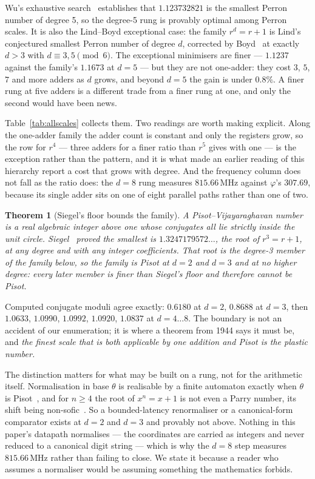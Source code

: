 \documentclass[11pt]{article}
\newtheorem{theorem}{Theorem}
\theoremstyle{definition}
\begin{document}
Wu's exhaustive search~\cite{wu2010} establishes that $1.123732821$ is the
smallest Perron number of degree 5, so the degree-5 rung is provably optimal
among Perron scales. It is also the Lind--Boyd exceptional case: the family
$r^d=r+1$ is Lind's conjectured smallest Perron number of degree $d$, corrected
by Boyd~\cite{boyd1985} at exactly $d>3$ with $d\equiv3,5 \pmod 6$. The
exceptional minimisers are finer --- $1.1237$ against the family's $1.1673$ at
$d=5$ --- but they are not one-adder: they cost $3$, $5$, $7$ and more adders as
$d$ grows, and beyond $d=5$ the gain is under $0.8\%$. A finer rung at five
adders is a different trade from a finer rung at one, and only the second would
have been news.

Table~\ref{tab:allscales} collects them. Two readings are worth making
explicit. Along the one-adder family the adder count is constant and only the
registers grow, so the row for $r^4$ --- three adders for a finer ratio than
$r^5$ gives with one --- is the exception rather than the pattern, and it is what
made an earlier reading of this hierarchy report a cost that grows with degree.
And the frequency column does not fall as the ratio does: the $d=8$ rung
measures $815.66$\,MHz against $\varphi$'s $307.69$, because its single adder
sits on one of eight parallel paths rather than one of two.

\begin{theorem}[Siegel's floor bounds the family]\label{thm:siegel}
A Pisot--Vijayaraghavan number is a real algebraic integer above one whose
conjugates all lie strictly inside the unit circle. Siegel~\cite{siegel1944}
proved the smallest is $1.3247179572\ldots$, the root of $r^3=r+1$, at any
degree and with any integer coefficients. That root is the degree-3 member of
the family below, so the family is Pisot at $d=2$ and $d=3$ and at no higher
degree: every later member is finer than Siegel's floor and therefore cannot be
Pisot.
\end{theorem}

Computed conjugate moduli agree exactly: $0.6180$ at $d=2$, $0.8688$ at $d=3$,
then $1.0633$, $1.0990$, $1.0992$, $1.0920$, $1.0837$ at $d=4\ldots8$. The
boundary is not an accident of our enumeration; it is where a theorem from 1944
says it must be, and \emph{the finest scale that is both applicable by one
addition and Pisot is the plastic number.}

The distinction matters for what may be built on a rung, not for the arithmetic
itself. Normalisation in base $\theta$ is realisable by a finite automaton
exactly when $\theta$ is Pisot~\cite{berend1994}, and for $n\ge4$ the root of
$x^n = x+1$ is not even a Parry number, its shift being
non-sofic~\cite{akiyama2016}. So a bounded-latency renormaliser or a
canonical-form comparator exists at $d=2$ and $d=3$ and provably not above.
Nothing in this paper's datapath normalises --- the coordinates are carried as
integers and never reduced to a canonical digit string --- which is why the
$d=8$ step measures $815.66$\,MHz rather than failing to close. We state it
because a reader who assumes a normaliser would be assuming something the
mathematics forbids.
\end{document}
